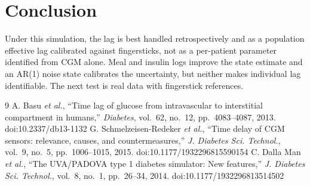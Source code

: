 \documentclass[11pt,a4paper]{article}
\begin{document}
\section{Conclusion}
Under this simulation, the lag is best handled retrospectively and as a population effective lag calibrated against fingersticks, not as a per-patient parameter identified from CGM alone. Meal and insulin logs improve the state estimate and an AR(1) noise state calibrates the uncertainty, but neither makes individual lag identifiable. The next test is real data with fingerstick references.

\begin{thebibliography}{9}
 A. Basu \emph{et al.}, ``Time lag of glucose from intravascular to interstitial compartment in humans,'' \emph{Diabetes}, vol.~62, no.~12, pp.~4083--4087, 2013. doi:10.2337/db13-1132
 G. Schmelzeisen-Redeker \emph{et al.}, ``Time delay of CGM sensors: relevance, causes, and countermeasures,'' \emph{J. Diabetes Sci. Technol.}, vol.~9, no.~5, pp.~1006--1015, 2015. doi:10.1177/1932296815590154
 C. Dalla Man \emph{et al.}, ``The UVA/PADOVA type 1 diabetes simulator: New features,'' \emph{J. Diabetes Sci. Technol.}, vol.~8, no.~1, pp.~26--34, 2014. doi:10.1177/1932296813514502
\end{thebibliography}
\end{document}
